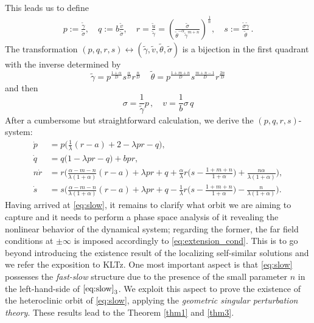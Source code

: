 \documentclass[a4paper,11pt]{article}
\def\tg{{\tilde{\gamma}}}
\def\tv{{\tilde{v}}}
\def\tth{{\tilde{\theta}}}
\def\ts{{\tilde{\sigma}}}
\def\tu{{\tilde{u}}}
\theoremstyle{remark}
\begin{document}
This leads us to define
\begin{equation}\label{eq:pqrdef} 
 \begin{aligned}
  p :=\frac{\tg}{\ts}, \quad q :=b \frac{\tv}{\ts},  \quad r = \frac{\tu}{\tg} = \left ( \frac{\ts}{ \tth^{-\alpha} \tg^{m+n}} \right )^\frac{1}{n}  , \quad s := \frac{\ts\tg}{\tth} \, .
 \end{aligned}
\end{equation}
The transformation $(p,q,r,s) \leftrightarrow (\tg,\tv, \tth,\ts)$ is a bijection in the first quadrant with the inverse determined by
$$
\tg = p^\frac{1+\alpha}{D} s^\frac{\alpha}{D} r^\frac{n}{D} \, \quad \tth = p^\frac{1+m+n}{D} s^\frac{m+n-1}{D} r^\frac{2n}{D}
$$
and then
$$
\sigma = \frac{1}{\tg} p \, , \quad v = \frac{1}{b} \sigma \, q
$$
After a cumbersome but straightforward calculation, we derive the $(p,q,r,s)$-system:
\begin{equation}\label{eq:slow} \tag{S}
 \begin{aligned}
 \dot{p} &=p\Big(\frac{1}{\lambda}(r-a) + 2- \lambda p r -q\Big),\\
 \dot{q} &=q\Big(1 -\lambda p r -q\Big) + b p r,\\
 n\dot{r} &=r\Big(\frac{\alpha-m-n}{\lambda(1+\alpha)}(r-a) + \lambda pr + q +\frac{\alpha}{\lambda}r\big(s- \frac{1+m+n}{1+\alpha}\big) + \frac{n\alpha}{\lambda(1+\alpha)}\Big),\\
 \dot{s} &=s\Big(\frac{\alpha-m-n}{\lambda(1+\alpha)}(r-a) + \lambda pr + q - \frac{1}{\lambda}r\big(s- \frac{1+m+n}{1+\alpha}\big) - \frac{n}{\lambda(1+\alpha)}\Big).
 \end{aligned}
\end{equation}
Having arrived at \eqref{eq:slow}, it remains to clarify what orbit we are aiming to capture and it needs to perform a phase space analysis of it revealing the nonlinear behavior of the dynamical system; regarding the former, the far field conditions at $\pm\infty$ is imposed accordingly to \eqref{eq:extension_cond}. This is to go beyond introducing the existence result of the localizing self-similar solutions and we refer the exposition to KLTz. One most important aspect is that \eqref{eq:slow} possesses the {\it fast-slow} structure due to the presence of the small parameter $n$ in the left-hand-side of $\eqref{eq:slow}_3$. We exploit this aspect to prove the existence of the heteroclinic orbit of \eqref{eq:slow},  applying the {\it geometric singular perturbation theory}. These results lead to the Theorem \ref{thm1} and \ref{thm3}. 
\end{document}
